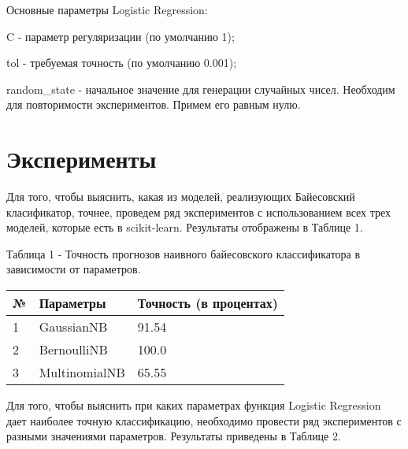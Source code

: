 \documentclass[a4paper,12pt]{article}
\begin{document}
	\vspace{0.5cm}
	Основные параметры Logistic Regression:
	
	\vspace{0.5cm}
	C - параметр регуляризации (по умолчанию 1);

	\vspace{0.5cm}
	tol - требуемая точность (по умолчанию 0.001);
	
	\vspace{0.5cm}
	random\_state - начальное значение для генерации случайных чисел. Необходим для повторимости экспериментов. Примем его равным нулю.


	
\newpage\section{Эксперименты}
	Для того, чтобы выяснить, какая из моделей, реализующих Байесовский класификатор, точнее, проведем ряд экспериментов  с использованием всех трех моделей, которые есть в scikit-learn. Результаты отображены в Таблице 1.
	
	\vspace{0.5cm}
	Таблица 1 - Точность прогнозов наивного байесовского классификатора в зависимости от параметров.
\begin{longtable}{|p{1cm}|p{9cm}|p{3cm}|}
\hline 
№ & Параметры & Точность (в процентах) \\ 
\hline 
1 & GaussianNB & 91.54 \\
\hline
2 & BernoulliNB & 100.0 \\
\hline 
3 & MultinomialNB & 65.55 \\
\hline
\end{longtable}	
	
	Для того, чтобы выяснить при каких параметрах функция Logistic Regression дает наиболее точную классификацию, необходимо провести ряд экспериментов с разными значениями параметров. Результаты приведены в Таблице 2.
	
\end{document}
